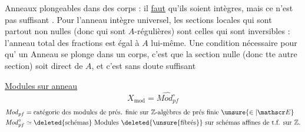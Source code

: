

Anneaux plongeables dans des corps : il \uline{faut} qu'ils soient intègres,
mais ce n'est pas suffisant . Pour l'anneau intègre universel, les sections locales qui sont partout non nulles (donc qui sont $A$-régulières) sont celles qui sont inversibles : l'anneau total des fractions  est égal à $A$ lui-même. Une condition nécessaire pour qu'  un Anneau se plonge  dans un corps, c'est que la section nulle (donc tte autre section) soit  direct de $A$, et c'est sans doute suffisant

\uline{Modules sur anneau}
\[
 X_{\mathrm{mod}}=\widehat{\mathit{Mod}^{\circ}_{pf}}
\]
\[
 \begin{aligned}\mathit{Mod}_{pf}&=\text{catégorie des modules de prés. finie sur $\mathbb Z$-algèbres de prés finie $\unsure{\in|\mathscr E}$}\\
 \mathit{Mod}_{pf}^{\circ}&\simeq\text{\deleted{schémas} Modules \deleted{\unsure{fibrés}} sur schémas affines de t.f. sur $\mathbb Z$.}
 \end{aligned}
\]

